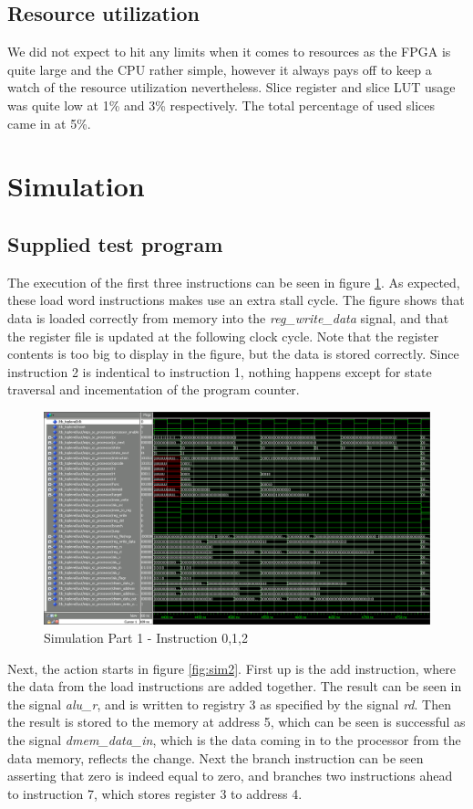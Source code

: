 \subsection{Resource utilization}
We did not expect to hit any limits when it comes to resources as the FPGA is quite large and the CPU rather simple, however it always pays off to keep a watch of the resource utilization nevertheless.
Slice register and slice LUT usage was quite low at 1\% and 3\% respectively.
The total percentage of used slices came in at 5\%.

\section{Simulation}
\subsection{Supplied test program}
The execution of the first three instructions can be seen in figure \ref{fig:sim1}. As expected, these load word instructions makes use an extra stall cycle. The figure shows that data is loaded correctly from memory into the \emph{reg_write_data} signal, and that the register file is updated at the following clock cycle. Note that the register contents is too big to display in the figure, but the data is stored correctly. Since instruction 2 is indentical to instruction 1, nothing happens except for state traversal and incementation of the program counter.
\begin{figure}[ht]
    \centering
    \includegraphics[scale=0.36]{figures/sim1.png}
    \caption{\label{fig:sim1}Simulation Part 1 - Instruction 0,1,2}
\end{figure}

Next, the action starts in figure \ref{fig:sim2}. First up is the add instruction, where the data from the load instructions are added together. The result can be seen in the signal \emph{alu_r}, and is written to registry 3 as specified by the signal \emph{rd}. Then the result is stored to the memory at address 5, which can be seen is successful as the signal \emph{dmem_data_in}, which is the data coming in to the processor from the data memory, reflects the change. Next the branch instruction can be seen asserting that zero is indeed equal to zero, and branches two instructions ahead to instruction 7, which stores register 3 to address 4.

